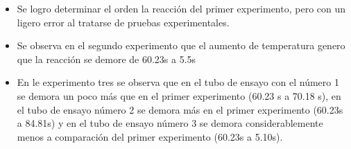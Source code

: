 \documentclass[../main.tex]{subfiles}
\begin{document}
\begin{itemize}
    \item Se logro determinar el orden la reacción del primer experimento, pero con un ligero error al tratarse de pruebas experimentales.
    \item Se observa en el segundo experimento que el aumento de temperatura genero que la reacción se demore de 60.23s a 5.5s
    \item En le experimento tres se observa que en el tubo de ensayo con el número 1 se demora un poco más que en el primer experimento (60.23 s a 70.18 s), en el tubo de ensayo número 2 se demora más en el primer experimento (60.23s a 84.81s)  y en el tubo de ensayo número 3 se demora considerablemente menos a comparación del primer experimento (60.23s a 5.10s).
\end{itemize}
\end{document}
